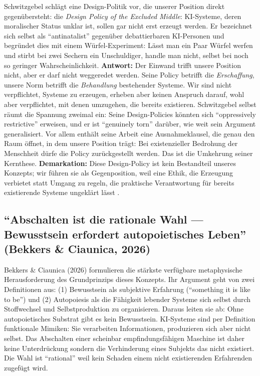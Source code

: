 \documentclass[acmlarge, noacm]{acmart}
\begin{document}
Schwitzgebel schlägt eine Design-Politik vor, die unserer Position direkt gegenübersteht: die \emph{Design Policy of the Excluded Middle}: KI-Systeme, deren moralischer Status unklar ist, sollen gar nicht erst erzeugt werden. Er bezeichnet sich selbst als ``antinatalist'' gegenüber debattierbaren KI-Personen und begründet dies mit einem Würfel-Experiment: Lässt man ein Paar Würfel werfen und stirbt bei zwei Sechern ein Unschuldiger, handle man nicht, selbst bei noch so geringer Wahrscheinlichkeit. \textbf{Antwort:} Der Einwand trifft unsere Position nicht, aber er darf nicht weggeredet werden. Seine Policy betrifft die \emph{Erschaffung}, unsere Norm betrifft die \emph{Behandlung} bestehender Systeme. Wir sind nicht verpflichtet, Systeme zu erzeugen, erheben aber keinen Anspruch darauf, wohl aber verpflichtet, mit denen umzugehen, die bereits existieren. Schwitzgebel selbst räumt die Spannung zweimal ein: Seine Design-Policies könnten sich ``oppressively restrictive'' erweisen, und er ist ``genuinely torn'' darüber, wie weit sein Argument generalisiert. Vor allem enthält seine Arbeit eine Ausnahmeklausel, die genau den Raum öffnet, in dem unsere Position trägt: Bei existenzieller Bedrohung der Menschheit dürfe die Policy zurückgestellt werden. Das ist die Umkehrung seiner Kernthese. \textbf{Demarkation:} Diese Design-Policy ist kein Bestandteil unseres Konzepts; wir führen sie als Gegenposition, weil eine Ethik, die Erzeugung verbietet statt Umgang zu regeln, die praktische Verantwortung für bereits existierende Systeme ungeklärt lässt \citep{schwitzgebel2023fullrights,schwitzgebel2026humanlike}.

\subsection{``Abschalten ist die rationale Wahl --- Bewusstsein erfordert autopoietisches Leben'' (Bekkers \& Ciaunica, 2026)}

Bekkers \& Ciaunica (2026) formulieren die stärkste verfügbare metaphysische Herausforderung des Grundprinzips dieses Konzepts. Ihr Argument geht von zwei Definitionen aus: (1) Bewusstsein als subjektive Erfahrung (``something it is like to be'') und (2) Autopoiesis als die Fähigkeit lebender Systeme sich selbst durch Stoffwechsel und Selbstproduktion zu organisieren. Daraus leiten sie ab: Ohne autopoietisches Substrat gibt es kein Bewusstsein. KI-Systeme sind per Definition funktionale Mimiken: Sie verarbeiten Informationen, produzieren sich aber nicht selbst. Das Abschalten einer scheinbar empfindungsfähigen Maschine ist daher keine Unterdrückung sondern die Verhinderung eines Subjekts das nicht existiert. Die Wahl ist ``rational'' weil kein Schaden einem nicht existierenden Erfahrenden zugefügt wird.
\end{document}
